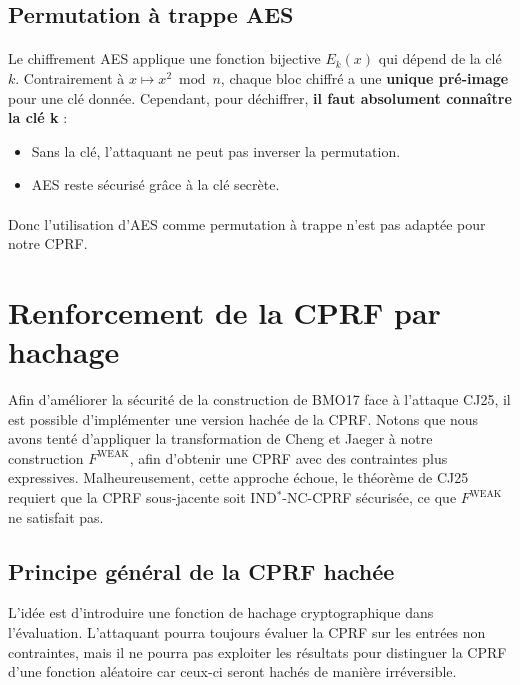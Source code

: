 \documentclass[9pt]{extarticle}
\begin{document}
\subsection{Permutation à trappe AES}
\paragraph{}
Le chiffrement AES applique une fonction bijective \(E_k(x)\) qui dépend de la clé \(k\).
Contrairement à \(x \mapsto x^2 \bmod n\), chaque bloc chiffré a une \textbf{unique pré-image} pour une clé donnée.
Cependant, pour déchiffrer, \textbf{il faut absolument connaître la clé k} :
\begin{itemize}
    \item Sans la clé, l'attaquant ne peut pas inverser la permutation.
    \item AES reste sécurisé grâce à la clé secrète.
\end{itemize}

\paragraph{}
Donc l'utilisation d'AES comme permutation à trappe n'est pas adaptée pour notre CPRF.


\section{Renforcement de la CPRF par hachage}

Afin d'améliorer la sécurité de la construction de BMO17 face à l'attaque CJ25, il est possible d'implémenter une version hachée de la CPRF.
Notons que nous avons tenté d'appliquer la transformation de Cheng et Jaeger à notre construction $F^{\text{WEAK}}$, afin d'obtenir une CPRF avec des contraintes plus expressives.
Malheureusement, cette approche échoue, le théorème de CJ25 requiert que la CPRF sous-jacente soit IND$^*$-NC-CPRF sécurisée, 
ce que $F^{\text{WEAK}}$ ne satisfait pas.

\subsection{Principe général de la CPRF hachée}

L’idée est d’introduire une fonction de hachage cryptographique dans l'évaluation. 
L'attaquant pourra toujours évaluer la CPRF sur les entrées non contraintes, 
mais il ne pourra pas exploiter les résultats pour distinguer la CPRF d’une fonction aléatoire
car ceux-ci seront hachés de manière irréversible.\\
\end{document}
